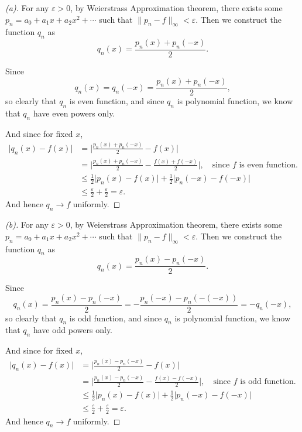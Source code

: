 \begin{proof}[(a)]
    For any $\varepsilon > 0$, by Weierstrass Approximation theorem, there exists some $p_n = a_0 + a_1x + a_2x^2 + \cdots $ such that $\|p_n - f\|_\infty < \varepsilon$.
    Then we construct the function $q_n$ as
    \[
        q_n(x) = \frac{p_n(x) + p_n(-x)}{2}.
    \]

    Since 
    \[
        q_n(x) = q_n(-x) = \frac{p_n(x) + p_n(-x)}{2},
    \]
    so clearly that $q_n$ is even function, and since $q_n$ is polynomial function, we know that $q_n$ have even powers only.

    And since for fixed $x$,
    \[
        \begin{aligned}
            \lvert q_n(x) - f(x)\rvert &= \lvert \frac{p_n(x) +p_n(-x)}{2} - f(x) \rvert \\
            &= \lvert \frac{p_n(x) +p_n(-x)}{2} - \frac{f(x) + f(-x)}{2} \rvert, \quad \text{since $f$ is even function}. \\
            &\le \frac{1}{2}\lvert p_n(x)- f(x)\rvert + \frac{1}{2}\lvert p_n(-x)- f(-x)\rvert \\
            &\le \frac{\varepsilon}{2} + \frac{\varepsilon}{2} = \varepsilon.
        \end{aligned}
    \]
    And hence $q_n \to f$ uniformly.
\end{proof}

\begin{proof}[(b)]
    For any $\varepsilon > 0$, by Weierstrass Approximation theorem, there exists some $p_n = a_0 + a_1x + a_2x^2 + \cdots $ such that $\|p_n - f\|_\infty < \varepsilon$.
    Then we construct the function $q_n$ as
    \[
        q_n(x) = \frac{p_n(x) - p_n(-x)}{2}.
    \]

    Since 
    \[
        q_n(x) = \frac{p_n(x) - p_n(-x)}{2} = - \frac{p_n(-x) - p_n(-(-x))}{2} = -q_n(-x),
    \]
    so clearly that $q_n$ is odd function, and since $q_n$ is polynomial function, we know that $q_n$ have odd powers only.

    And since for fixed $x$,
    \[
        \begin{aligned}
            \lvert q_n(x) - f(x)\rvert &= \lvert \frac{p_n(x) - p_n(-x)}{2} - f(x) \rvert \\
            &= \lvert \frac{p_n(x) - p_n(-x)}{2} - \frac{f(x) - f(-x)}{2} \rvert, \quad \text{since $f$ is odd function}. \\
            &\le \frac{1}{2}\lvert p_n(x)- f(x)\rvert + \frac{1}{2}\lvert p_n(-x)- f(-x)\rvert \\
            &\le \frac{\varepsilon}{2} + \frac{\varepsilon}{2} = \varepsilon.
        \end{aligned}
    \]
    And hence $q_n \to f$ uniformly.
\end{proof}
    
